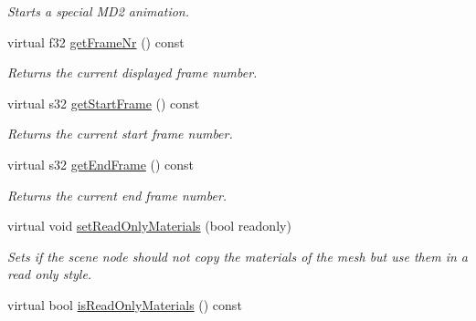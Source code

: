 \begin{DoxyCompactItemize}
\begin{DoxyCompactList}\small\item\em Starts a special M\-D2 animation. \end{DoxyCompactList}\item 
virtual f32 \hyperlink{classirr_1_1scene_1_1_c_animated_mesh_scene_node_a8e9cb2aa20af7292f535cee8f99c1c6b}{get\-Frame\-Nr} () const 
\begin{DoxyCompactList}\small\item\em Returns the current displayed frame number. \end{DoxyCompactList}\item 
\hypertarget{classirr_1_1scene_1_1_c_animated_mesh_scene_node_af719214d16c21a56bba384c9f6504a41}{virtual s32 \hyperlink{classirr_1_1scene_1_1_c_animated_mesh_scene_node_af719214d16c21a56bba384c9f6504a41}{get\-Start\-Frame} () const }\label{classirr_1_1scene_1_1_c_animated_mesh_scene_node_af719214d16c21a56bba384c9f6504a41}

\begin{DoxyCompactList}\small\item\em Returns the current start frame number. \end{DoxyCompactList}\item 
virtual s32 \hyperlink{classirr_1_1scene_1_1_c_animated_mesh_scene_node_a26ab65228d1a1628d57ed56374743855}{get\-End\-Frame} () const 
\begin{DoxyCompactList}\small\item\em Returns the current end frame number. \end{DoxyCompactList}\item 
\hypertarget{classirr_1_1scene_1_1_c_animated_mesh_scene_node_ae0ccc39f143b75e7ed9740a915cf8f40}{virtual void \hyperlink{classirr_1_1scene_1_1_c_animated_mesh_scene_node_ae0ccc39f143b75e7ed9740a915cf8f40}{set\-Read\-Only\-Materials} (bool readonly)}\label{classirr_1_1scene_1_1_c_animated_mesh_scene_node_ae0ccc39f143b75e7ed9740a915cf8f40}

\begin{DoxyCompactList}\small\item\em Sets if the scene node should not copy the materials of the mesh but use them in a read only style. \end{DoxyCompactList}\item 
\hypertarget{classirr_1_1scene_1_1_c_animated_mesh_scene_node_a28d61506c53d44f89b3a8c21508c21c1}{virtual bool \hyperlink{classirr_1_1scene_1_1_c_animated_mesh_scene_node_a28d61506c53d44f89b3a8c21508c21c1}{is\-Read\-Only\-Materials} () const }\label{classirr_1_1scene_1_1_c_animated_mesh_scene_node_a28d61506c53d44f89b3a8c21508c21c1}


\end{DoxyCompactItemize}
